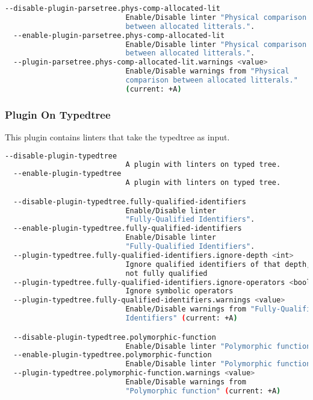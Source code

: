 \begin{lstlisting}[language=bash,basicstyle=\tt\small,showspaces=false,showstringspaces=false]
  --disable-plugin-parsetree.phys-comp-allocated-lit  
                            Enable/Disable linter "Physical comparison 
                            between allocated litterals.".
  --enable-plugin-parsetree.phys-comp-allocated-lit  
                            Enable/Disable linter "Physical comparison 
                            between allocated litterals.".
  --plugin-parsetree.phys-comp-allocated-lit.warnings <value> 
                            Enable/Disable warnings from "Physical 
                            comparison between allocated litterals." 
                            (current: +A)
\end{lstlisting}

\subsubsection*{Plugin On Typedtree}
This plugin contains linters that take the typedtree as input.

\begin{lstlisting}[language=bash,basicstyle=\tt\small,showspaces=false,showstringspaces=false]
  --disable-plugin-typedtree  
                            A plugin with linters on typed tree.
  --enable-plugin-typedtree  
                            A plugin with linters on typed tree.

  --disable-plugin-typedtree.fully-qualified-identifiers  
                            Enable/Disable linter 
                            "Fully-Qualified Identifiers".
  --enable-plugin-typedtree.fully-qualified-identifiers  
                            Enable/Disable linter 
                            "Fully-Qualified Identifiers".
  --plugin-typedtree.fully-qualified-identifiers.ignore-depth <int> 
                            Ignore qualified identifiers of that depth, 
                            not fully qualified
  --plugin-typedtree.fully-qualified-identifiers.ignore-operators <bool> 
                            Ignore symbolic operators
  --plugin-typedtree.fully-qualified-identifiers.warnings <value> 
                            Enable/Disable warnings from "Fully-Qualified
                            Identifiers" (current: +A)

  --disable-plugin-typedtree.polymorphic-function  
                            Enable/Disable linter "Polymorphic function".
  --enable-plugin-typedtree.polymorphic-function  
                            Enable/Disable linter "Polymorphic function".
  --plugin-typedtree.polymorphic-function.warnings <value> 
                            Enable/Disable warnings from 
                            "Polymorphic function" (current: +A)
\end{lstlisting}

